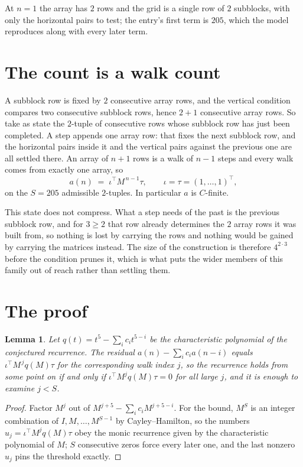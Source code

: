 \documentclass[11pt,a4paper]{article}
\theoremstyle{plain}
\newtheorem{lemma}[theorem]{Lemma}
\theoremstyle{definition}
\begin{document}
At $n=1$ the array has $2$ rows and the grid is a single row of $2$
subblocks, with only the horizontal pairs to test; the entry's first term is
$205$, which the model reproduces along with every later term.

\section{The count is a walk count}

A subblock row is fixed by $2$ consecutive array rows, and the vertical condition compares
two consecutive subblock rows, hence $2+1$ consecutive array rows. So take as state the
$2$-tuple of consecutive rows whose subblock row has just been completed. A step appends one
array row: that fixes the next subblock row, and the horizontal pairs inside it and the
vertical pairs against the previous one are all settled there. An array of $n+1$ rows is
a walk of $n-1$ steps and every walk comes from exactly one array, so
\[
a(n)\;=\;\iota^{\!\top}M^{\,n-1}\tau,\qquad\iota=\tau=(1,\dots,1)^{\!\top},
\]
on the $S=205$ admissible $2$-tuples. In particular $a$ is $C$-finite.

This state does not compress. What a step needs of the past is the previous subblock row, and
for $3\ge2$ that row already determines the $2$ array rows it was built from, so nothing
is lost by carrying the rows and nothing would be gained by carrying the matrices instead. The
size of the construction is therefore $4^{2\cdot3}$ before the condition prunes
it, which is what puts the wider members of this family out of reach rather than settling them.

\section{The proof}

\begin{lemma}\label{lem:crit}
Let $q(t)=t^{5}-\sum_i c_it^{5-i}$ be the characteristic polynomial of the
conjectured recurrence. The residual $a(n)-\sum_ic_ia(n-i)$ equals
$\iota^{\!\top}M^{\,j}q(M)\tau$ for the corresponding walk index $j$, so the recurrence
holds from some point on if and only if $\iota^{\!\top}M^{j}q(M)\tau=0$ for all large $j$,
and it is enough to examine $j<S$.
\end{lemma}

\begin{proof}
Factor $M^{j}$ out of $M^{j+5}-\sum_ic_iM^{j+5-i}$. For the bound, $M^{S}$
is an integer combination of $I,M,\dots,M^{S-1}$ by Cayley--Hamilton, so the numbers
$u_j=\iota^{\!\top}M^{j}q(M)\tau$ obey the monic recurrence given by the characteristic
polynomial of $M$; $S$ consecutive zeros force every later one, and the last nonzero $u_j$
pins the threshold exactly.
\end{proof}
\end{document}
